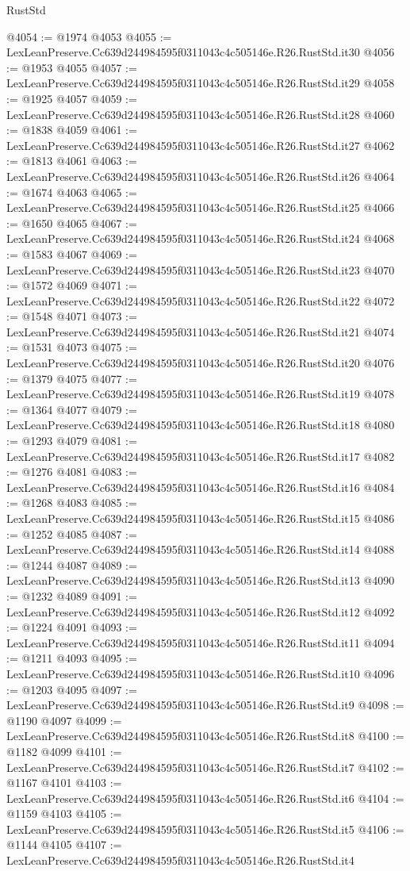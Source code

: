 \begin{lexlean}{RustStd}
\begin{coremodule}
@4054 := @1974 @4053
@4055 := LexLeanPreserve.Cc639d244984595f0311043c4c505146e.R26.RustStd.it30
@4056 := @1953 @4055
@4057 := LexLeanPreserve.Cc639d244984595f0311043c4c505146e.R26.RustStd.it29
@4058 := @1925 @4057
@4059 := LexLeanPreserve.Cc639d244984595f0311043c4c505146e.R26.RustStd.it28
@4060 := @1838 @4059
@4061 := LexLeanPreserve.Cc639d244984595f0311043c4c505146e.R26.RustStd.it27
@4062 := @1813 @4061
@4063 := LexLeanPreserve.Cc639d244984595f0311043c4c505146e.R26.RustStd.it26
@4064 := @1674 @4063
@4065 := LexLeanPreserve.Cc639d244984595f0311043c4c505146e.R26.RustStd.it25
@4066 := @1650 @4065
@4067 := LexLeanPreserve.Cc639d244984595f0311043c4c505146e.R26.RustStd.it24
@4068 := @1583 @4067
@4069 := LexLeanPreserve.Cc639d244984595f0311043c4c505146e.R26.RustStd.it23
@4070 := @1572 @4069
@4071 := LexLeanPreserve.Cc639d244984595f0311043c4c505146e.R26.RustStd.it22
@4072 := @1548 @4071
@4073 := LexLeanPreserve.Cc639d244984595f0311043c4c505146e.R26.RustStd.it21
@4074 := @1531 @4073
@4075 := LexLeanPreserve.Cc639d244984595f0311043c4c505146e.R26.RustStd.it20
@4076 := @1379 @4075
@4077 := LexLeanPreserve.Cc639d244984595f0311043c4c505146e.R26.RustStd.it19
@4078 := @1364 @4077
@4079 := LexLeanPreserve.Cc639d244984595f0311043c4c505146e.R26.RustStd.it18
@4080 := @1293 @4079
@4081 := LexLeanPreserve.Cc639d244984595f0311043c4c505146e.R26.RustStd.it17
@4082 := @1276 @4081
@4083 := LexLeanPreserve.Cc639d244984595f0311043c4c505146e.R26.RustStd.it16
@4084 := @1268 @4083
@4085 := LexLeanPreserve.Cc639d244984595f0311043c4c505146e.R26.RustStd.it15
@4086 := @1252 @4085
@4087 := LexLeanPreserve.Cc639d244984595f0311043c4c505146e.R26.RustStd.it14
@4088 := @1244 @4087
@4089 := LexLeanPreserve.Cc639d244984595f0311043c4c505146e.R26.RustStd.it13
@4090 := @1232 @4089
@4091 := LexLeanPreserve.Cc639d244984595f0311043c4c505146e.R26.RustStd.it12
@4092 := @1224 @4091
@4093 := LexLeanPreserve.Cc639d244984595f0311043c4c505146e.R26.RustStd.it11
@4094 := @1211 @4093
@4095 := LexLeanPreserve.Cc639d244984595f0311043c4c505146e.R26.RustStd.it10
@4096 := @1203 @4095
@4097 := LexLeanPreserve.Cc639d244984595f0311043c4c505146e.R26.RustStd.it9
@4098 := @1190 @4097
@4099 := LexLeanPreserve.Cc639d244984595f0311043c4c505146e.R26.RustStd.it8
@4100 := @1182 @4099
@4101 := LexLeanPreserve.Cc639d244984595f0311043c4c505146e.R26.RustStd.it7
@4102 := @1167 @4101
@4103 := LexLeanPreserve.Cc639d244984595f0311043c4c505146e.R26.RustStd.it6
@4104 := @1159 @4103
@4105 := LexLeanPreserve.Cc639d244984595f0311043c4c505146e.R26.RustStd.it5
@4106 := @1144 @4105
@4107 := LexLeanPreserve.Cc639d244984595f0311043c4c505146e.R26.RustStd.it4

\end{coremodule}
\end{lexlean}
